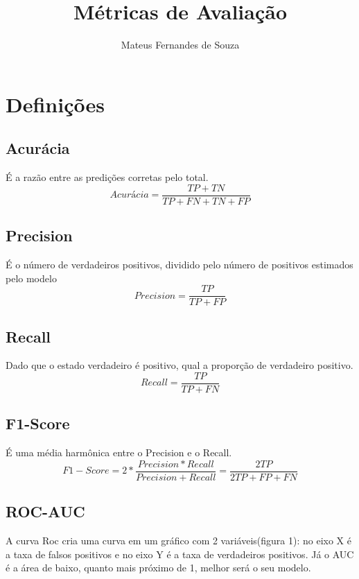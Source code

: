 \documentclass{article}
\title{Métricas de Avaliação}
\author{Mateus Fernandes de Souza}
\begin{document}
\maketitle

\section{Definições}


\subsection{Acurácia}
É a razão entre as predições corretas pelo total.
\begin{equation*}
    Acurácia = \frac{TP + TN}{TP + FN + TN + FP}
\end{equation*}

\subsection{Precision}
É o número de verdadeiros positivos, dividido pelo número de positivos estimados pelo modelo
\begin{equation*}
    Precision = \frac{TP}{TP+ FP}
\end{equation*}

\subsection{Recall}
Dado que o estado verdadeiro é positivo, qual a proporção de verdadeiro positivo.
\begin{equation*}
    Recall = \frac{TP}{TP+ FN}
\end{equation*}

\subsection{F1-Score}
É uma média harmônica entre o Precision e o Recall.
\begin{equation*}
    F1-Score = 2*\frac{Precision*Recall}{Precision  + Recall} = \frac{2TP}{2TP+ FP +FN}
\end{equation*}

\subsection{ROC-AUC}
A curva Roc cria uma curva em um gráfico com 2 variáveis(figura 1): no eixo X é a taxa de falsos positivos e no eixo Y é a taxa de verdadeiros positivos. Já o AUC é a área de baixo, quanto mais próximo de 1, melhor será o seu modelo.
\end{document}
